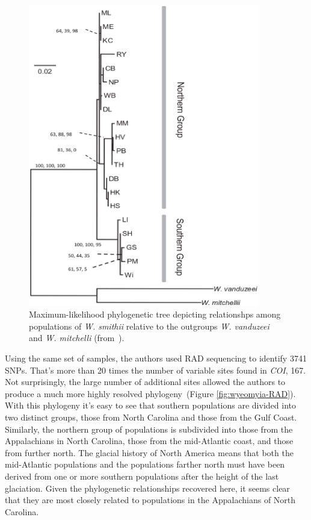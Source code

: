 \documentclass[12pt]{article}
\begin{document}
\begin{figure}
\begin{center}
\includegraphics[width=0.9\textwidth]{wyeomyia-COI.eps}
\end{center}
\caption{Maximum-likelihood phylogenetic tree depicting relationshps
  among populations of {\it W. smithii\/} relative to the outgroups
  {\it W. vanduzeei\/} and {\it W. mitchelli} (from~\cite{Emerson-etal-2010}).}\label{fig:wyeomyia-COI}
\end{figure}

Using the same set of samples, the authors used RAD sequencing to
identify 3741 SNPs. That's more than 20 times the number of variable
sites found in {\it COI}, 167. Not surprisingly, the large number of
additional sites allowed the authors to produce a much more highly
resolved phylogeny~(Figure \ref{fig:wyeomyia-RAD}). With this
phylogeny it's easy to see that southern populations are divided into
two distinct groups, those from North Carolina and those from the Gulf
Coast. Similarly, the northern group of populations is subdivided into
those from the Appalachians in North Carolina, those from the
mid-Atlantic coast, and those from further north. The glacial history
of North America means that both the mid-Atlantic populations and the
populations farther north must have been derived from one or more
southern populations after the height of the last glaciation. Given
the phylogenetic relationships recovered here, it seems clear that
they are most closely related to populations in the Appalachians of
North Carolina.
\end{document}
